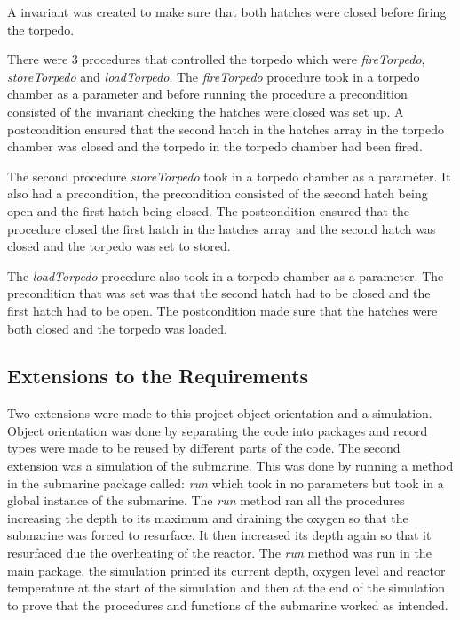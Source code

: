 A invariant was created to make sure that both hatches were closed before firing the torpedo. 

There were 3 procedures that controlled the torpedo which were \textit{fireTorpedo}, \textit{storeTorpedo} and \textit{loadTorpedo}. The \textit{fireTorpedo} procedure took in a torpedo chamber as a parameter and before running the procedure a precondition consisted of the invariant checking the hatches were closed was set up. A postcondition ensured that the second hatch in the hatches array in the torpedo chamber was closed and the torpedo in the torpedo chamber had been fired. 

The second procedure \textit{storeTorpedo} took in a torpedo chamber as a parameter. It also had a precondition, the precondition consisted of the second hatch being open and the first hatch being closed. The postcondition ensured that the procedure closed the first hatch in the hatches array and the second hatch was closed and the torpedo was set to stored.

 The \textit{loadTorpedo} procedure also took in a torpedo chamber as a parameter. The precondition that was set was that the second hatch had to be closed and the first hatch had to be open. The postcondition made sure that the hatches were both closed and the torpedo was loaded.

\subsection{Extensions to the Requirements}
Two extensions were made to this project object orientation and a simulation. Object orientation was done by separating the code into packages and record types were made to be reused by different parts of the code. The second extension was a simulation of the submarine. This was done by running a method in the submarine package called: \textit{run} which took in no parameters but took in a global instance of the submarine. The \textit{run} method ran all the procedures increasing the depth to its maximum and draining the oxygen so that the submarine was forced to resurface. It then increased its depth again so that it resurfaced due the overheating of the reactor. The \textit{run} method was run in the main package, the simulation printed its current depth, oxygen level and reactor temperature at the start of the simulation and then at the end of the simulation to prove that the procedures and functions of the submarine worked as intended.
